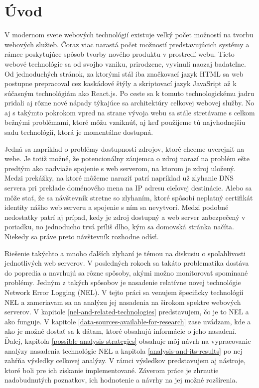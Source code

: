\chapter{Úvod}
\label{uvod}
\vspace{1cm}

V modernom svete webových technológií existuje veľký počet možností na tvorbu webových služieb. Čoraz viac narastá počet možností predstavujúcich systémy a rámce poskytujúce spôsob tvorby nového produktu v prostredí webu.
Tieto webové technológie sa od svojho vzniku, prirodzene, vyvinuli naozaj badateľne. 
Od jednoduchých stránok, za ktorými stál iba značkovací jazyk 
HTML sa web postupne prepracoval cez kaskádové štýly a skriptovací jazyk 
JavaSript až k súčasným technológiám ako React.js. 
Po ceste sa k tomuto technologickému jadru pridali aj rôzne 
nové nápady týkajúce sa architektúry celkovej webovej služby.
No aj s takýmto pokrokom vpred na strane vývoja webu sa stále stretávame s celkom bežnými problémami, ktoré môžu vzniknúť, aj 
keď použijeme tú najvhodnejšiu sadu technológií, ktorá je momentálne dostupná.

Jedná sa napríklad o problémy dostupnosti zdrojov, ktoré chceme uverejniť na webe. 
Je totiž možné, že potencionálny záujemca o zdroj narazí na problém ešte predtým ako nadviaže spojenie s web serverom, na ktorom je zdroj uložený.
Medzi prekážky, na ktoré môžeme naraziť patrí napríklad už zlyhanie DNS servera pri preklade doménového mena na IP adresu cieľovej destinácie. 
Alebo sa môže stať, že sa návštevník stretne so zlyhaním, ktoré spôsobí neplatný certifikát identity nášho web serveru a spojenie s ním sa nevytvorí. 
Medzi podobné nedostatky patrí aj prípad, kedy je zdroj dostupný a web server zabezpečený v poriadku, no jednoducho trvá príliš dlho, kým sa domovská stránka načíta. Niekedy sa práve preto návštevník rozhodne odísť.

Riešenie takýchto a mnoho ďalších zlyhaní je témou na diskusiu o spoľahlivosti jednotlivých web serverov. 
V posledných rokoch sa takáto problematika dostáva do popredia a navrhujú sa rôzne 
spôsoby, akými možno monitorovať spomínané problémy. Jedným z takých spôsobov je nasadenie relatívne novej 
technológie Network Error Logging (NEL).
V tejto práci sa venujem špecificky technológií NEL a zameriavam sa na analýzu jej nasadenia na širokom spektre webových serverov. 
V kapitole \ref{nel-and-related-technologies} predstavujem, čo je to NEL a ako funguje. V kapitole \ref{data-sources-available-for-research} zase uvádzam, kde a ako je možné dostať sa k dátam, ktoré obsahujú informácie o jeho nasadení.
Ďalej, kapitola \ref{possible-analysis-strategies} obsahuje môj návrh na vypracovanie analýzy nasadenia technológie NEL a kapitola \ref{analysis-and-its-results} po nej zahŕňa výsledky celkovej analýzy.
V rámci výsledkov predstavujem aj nástroje, ktoré boli pre ich získanie implementované. Záverom práce je zhrnutie nadobudnutých poznatkov, ich hodnotenie a návrhy na jej možné rozšírenia.
